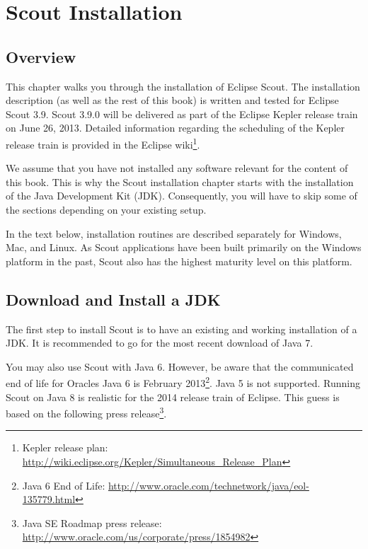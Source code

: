 \documentclass[a4paper,10pt,twoside]{book}
\begin{document}
  \sloppy
\fi


\chapter{Scout Installation}

\section{Overview}

This chapter walks you through the installation of Eclipse Scout. 
The installation description (as well as the rest of this book) is written and tested for Eclipse Scout 3.9.
Scout 3.9.0 will be delivered as part of the Eclipse Kepler release train on June 26, 2013.
Detailed information regarding the scheduling of the Kepler release train is provided in the Eclipse
wiki\footnote{Kepler release plan: \url{http://wiki.eclipse.org/Kepler/Simultaneous_Release_Plan}}.

We assume that you have not installed any software relevant for the content of this book.
This is why the Scout installation chapter starts with the installation of the Java Development Kit (JDK).
Consequently, you will have to skip some of the sections depending on your existing setup.

In the text below, installation routines are described separately for Windows, Mac, and Linux.
As Scout applications have been built primarily on the Windows platform in the past, Scout also has the highest maturity level on this platform.

\section{Download and Install a JDK}

The first step to install Scout is to have an existing and working installation of a JDK.
It is recommended to go for the most recent download of Java 7.

You may also use Scout with Java 6.
However, be aware that the communicated end of life for Oracles Java 6 is February 
2013\footnote{Java 6 End of Life: \url{http://www.oracle.com/technetwork/java/eol-135779.html}}.
Java 5 is not supported. 
Running Scout on Java 8 is realistic for the 2014 release train of Eclipse.
This guess is based on the following press 
release\footnote{Java SE Roadmap press release: \url{http://www.oracle.com/us/corporate/press/1854982}}.
\end{document}
